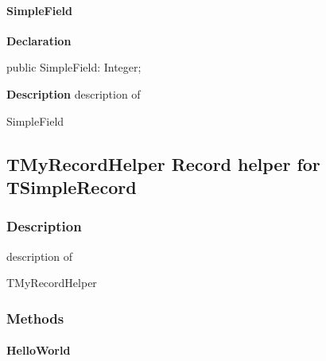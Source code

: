 \documentclass{report}
\begin{document}
\paragraph*{SimpleField}\hspace*{\fill}

\begin{list}{}{
\setlength{\itemindent}{0cm}
\setlength{\listparindent}{0cm}
\setlength{\leftmargin}{\evensidemargin}
\addtolength{\leftmargin}{\tmplength}
\settowidth{\labelsep}{X}
\addtolength{\leftmargin}{\labelsep}
\setlength{\labelwidth}{\tmplength}
}
\begin{flushleft}
\item[\textbf{Declaration}\hfill]
\begin{ttfamily}
public SimpleField: Integer;\end{ttfamily}


\end{flushleft}
\par
\item[\textbf{Description}]
description of \begin{ttfamily}SimpleField\end{ttfamily}

\end{list}
\subsection*{TMyRecordHelper Record helper for TSimpleRecord}
\subsubsection*{\large{\textbf{Description}}\normalsize\hspace{1ex}\hfill}
description of \begin{ttfamily}TMyRecordHelper\end{ttfamily}\subsubsection*{\large{\textbf{Methods}}\normalsize\hspace{1ex}\hfill}
\paragraph*{HelloWorld}\hspace*{\fill}
\end{document}
